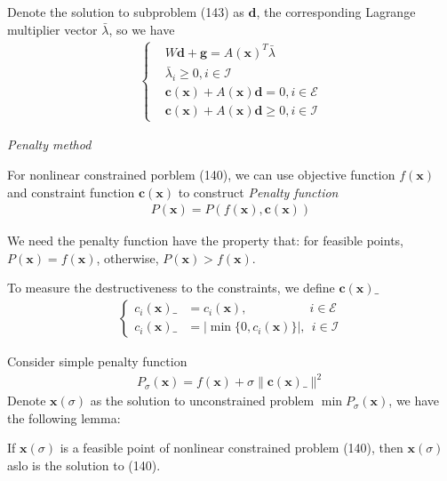 \documentclass[runningheads]{llncs}
\begin{document}
Denote the solution to subproblem (143) as $\mathbf{d}$,
the corresponding Lagrange multiplier vector $\bar{\lambda}$,
so we have
\begin{align}
    \left\{
        \begin{array}{llll}
            &W\mathbf{d} + \mathbf{g} = A(\mathbf{x})^T\bar{\lambda} \\
            &\bar{\lambda}_i \geq 0, i \in \mathcal{I} \\
            &\mathbf{c}(\mathbf{x}) + A(\mathbf{x})\mathbf{d} = 0, i \in \mathcal{E} \\
            &\mathbf{c}(\mathbf{x}) + A(\mathbf{x})\mathbf{d} \geq 0, i \in \mathcal{I}
        \end{array}\right.
\end{align}

\par
\emph{Penalty method}
\par
For nonlinear constrained porblem (140),
we can use objective function $f(\mathbf{x})$
and constraint function $\mathbf{c}(\mathbf{x})$
to construct \emph{Penalty function}
\begin{align}
    P(\mathbf{x}) = P(f(\mathbf{x}), \mathbf{c}(\mathbf{x}))
\end{align}

We need the penalty function have the property that:
for feasible points, $P(\mathbf{x}) = f(\mathbf{x})$,
otherwise, $P(\mathbf{x}) > f(\mathbf{x})$.
\par
To measure the destructiveness to the constraints,
we define $\mathbf{c}(\mathbf{x})\_$
\begin{align}
    \left\{
        \begin{array}{ll}
            c_i(\mathbf{x})\_ &= c_i(\mathbf{x}), \quad \quad \quad \quad \quad i\in \mathcal{E} \\
            c_i(\mathbf{x})\_ &= |\min \{ 0, c_i(\mathbf{x}) \}|,\ \ i \in \mathcal{I}
        \end{array}\right.
\end{align}

Consider simple penalty function
\begin{align}
    P_\sigma(\mathbf{x}) = f(\mathbf{x}) + 
    \sigma \parallel \mathbf{c}(\mathbf{x})\_ \parallel^2
\end{align}
Denote $\mathbf{x}(\sigma)$ as the solution to unconstrained
problem $\min P_\sigma(\mathbf{x})$, we have the following lemma:

\begin{lemma}
    If $\mathbf{x}(\sigma)$ is a feasible point of nonlinear
    constrained problem \textnormal{(140)}, then $\mathbf{x}(\sigma)$
    aslo is the solution to \textnormal{(140)}.
\end{lemma}
\end{document}
